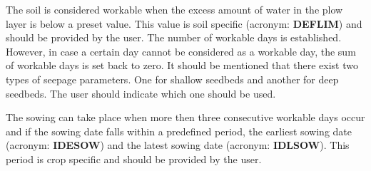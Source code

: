 \documentclass[11pt]{article}
\begin{document}
\bigskip
\bigskip
The soil is considered workable when the excess amount of water in the plow layer is
below a preset value. This value is soil specific (acronym: {\bf DEFLIM}) and should be
provided by the user. The number of workable days is established. However, in case a
certain day cannot be considered as a workable day, the sum of workable days is set back
to zero. It should be mentioned that there exist two types of seepage parameters. One for
shallow seedbeds and another for deep seedbeds. The user should indicate which one
should be used.

\bigskip
The sowing can take place when more then three consecutive workable days occur and if
the sowing date falls within a predefined period, the earliest sowing date (acronym:
{\bf IDESOW}) and the latest sowing date (acronym: {\bf IDLSOW}). This period is crop specific
and should be provided by the user. 
\end{document}
